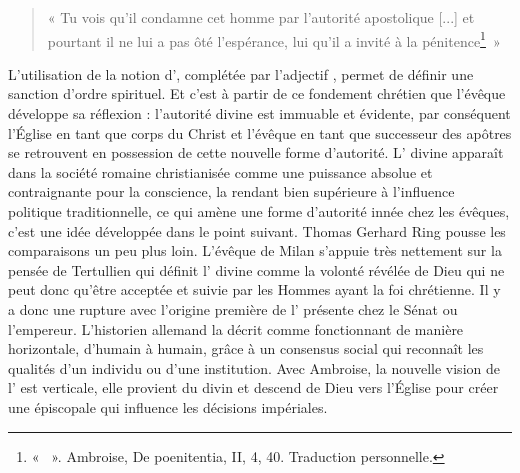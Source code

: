 \bigskip

\begin{quote}
    « Tu vois qu’il condamne cet homme par l’autorité apostolique [...] et pourtant il ne lui a pas ôté l’espérance, lui qu'il a invité à la pénitence\footnote{« ~». Ambroise, De poenitentia, II, 4, 40. Traduction personnelle.}~»
\end{quote}

\bigskip

L’utilisation de la notion d’, complétée par l'adjectif , permet de définir une sanction d’ordre spirituel. Et c’est à partir de ce fondement chrétien que l’évêque développe sa réflexion : l’autorité divine est immuable et évidente, par conséquent l’Église en tant que corps du Christ et l’évêque en tant que successeur des apôtres se retrouvent en possession de cette nouvelle forme d’autorité. L’ divine apparaît dans la société romaine christianisée comme une puissance absolue et contraignante pour la conscience, la rendant bien supérieure à l'influence politique traditionnelle, ce qui amène une forme d’autorité innée chez les évêques, c’est une idée développée dans le point suivant. Thomas Gerhard Ring pousse les comparaisons un peu plus loin. L’évêque de Milan s’appuie très nettement sur la pensée de Tertullien qui définit l’ divine comme la volonté révélée de Dieu qui ne peut donc qu’être acceptée et suivie par les Hommes ayant la foi chrétienne. Il y a donc une rupture avec l’origine première de l’ présente chez le Sénat ou l’empereur. L’historien allemand la décrit comme fonctionnant de manière horizontale, d’humain à humain, grâce à un consensus social qui reconnaît les qualités d’un individu ou d’une institution. Avec Ambroise, la nouvelle vision de l’ est verticale, elle provient du divin et descend de Dieu vers l’Église pour créer une  épiscopale qui influence les décisions impériales\autocite[À partir de la page 163]{ring_auctoritas}.

\bigskip

